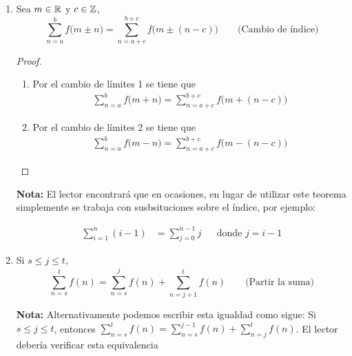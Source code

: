 \begin{enumerate}[label=\alph*)]
  \item Sea $m\in \mathbb{R}$ y $c\in \mathbb{Z}$, \[\sum_{n=a}^{b}f\bigl(m\pm n\bigr) = \sum_{n=a+c}^{b+c}f\bigl(m\pm (n- c)\bigr) \qquad \text{(Cambio de índice)}\]
  \begin{proof}\leavevmode
    \begin{enumerate}[label=\roman*)]
      \item Por el cambio de límites 1 se tiene que 
      \begin{align*}
        \sum_{n=a}^{b}f\bigl(m+ n\bigr) = \sum_{n=a+c}^{b+c}f\bigl(m+ (n- c)\bigr)
      \end{align*}
      \item Por el cambio de límites 2 se tiene que
      \begin{align*}
        \sum_{n=a}^{b}f\bigl(m-n\bigr) = \sum_{n=a+c}^{b+c}f\bigl(m-(n- c)\bigr)
      \end{align*}
    \end{enumerate}
  \end{proof}

  \textbf{Nota:} El lector encontrará que en ocasiones, en lugar de utilizar este teorema simplemente se trabaja con susbsituciones sobre el índice, por ejemplo:

  \begin{align*}
    \sum_{i=1}^{n} (i-1) &= \sum_{j=0}^{n-1} j && \text{donde $j=i-1$}
  \end{align*}

  \item Si $s\leq j\leq t$, \[\sum_{n=s}^{t}f(n) = \sum_{n=s}^{j}f(n) + \sum_{n=j+1}^{t}f(n) \qquad \text{(Partir la suma)}\]
  
  \textbf{Nota:} Alternativamente podemos escribir esta igualdad como sigue: Si $s\leq j\leq t$, entonces $\sum_{n=s}^{t}f(n) = \sum_{n=s}^{j-1}f(n) + \sum_{n=j}^{t}f(n)$. El lector debería verificar esta equivalencia


\end{enumerate}
